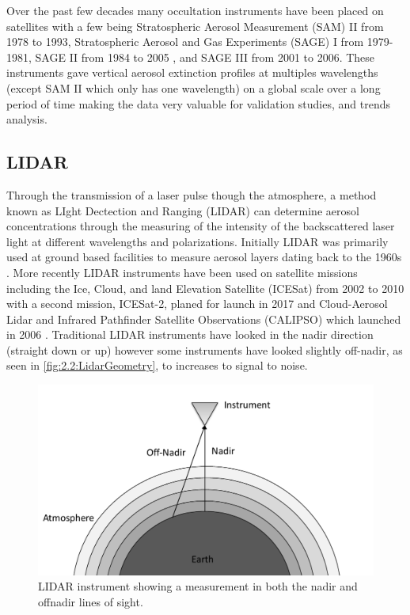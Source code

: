 Over the past few decades many occultation instruments have been placed on satellites with a few being Stratospheric Aerosol Measurement (SAM) II from 1978 to 1993, Stratospheric Aerosol and Gas Experiments (SAGE) I \citep{McCormick1979} from 1979-1981, SAGE II \citep{McCormick1987} from 1984 to 2005 , and SAGE III \citep{Thomason2003} from 2001 to 2006. These instruments gave vertical aerosol extinction profiles at multiples wavelengths (except SAM II which only has one wavelength) on a global scale over a long period of time making the data very valuable for validation studies, and trends analysis.

\subsection{LIDAR}

Through the transmission of a laser pulse though the atmosphere, a method known as LIght Dectection and Ranging (LIDAR) can determine aerosol concentrations through the measuring of the intensity of the backscattered laser light at different wavelengths and polarizations. Initially LIDAR was primarily used at ground based facilities to measure aerosol layers dating back to the 1960s \citep{Fiocco1964}. More recently LIDAR instruments have been used on satellite missions including the Ice, Cloud, and land Elevation Satellite (ICESat) from 2002 to 2010 \citep{Schutz2005} with a second mission, ICESat-2, planed for launch in 2017 and Cloud-Aerosol Lidar and Infrared Pathfinder Satellite Observations (CALIPSO) which launched in 2006 \citep{Winker2007}. Traditional LIDAR instruments have looked in the nadir direction (straight down or up) however some instruments have looked slightly off-nadir, as seen in \autoref{fig:2.2:LidarGeometry}, to increases to signal to noise.

\begin{figure}
    \includegraphics[width=1.0\textwidth]{./Images/2-2-LidarGeometry.pdf}
    \caption[LIDAR Geometry]{LIDAR instrument showing a measurement in both the nadir and offnadir lines of sight.}
    \label{fig:2.2:LidarGeometry}
\end{figure}

